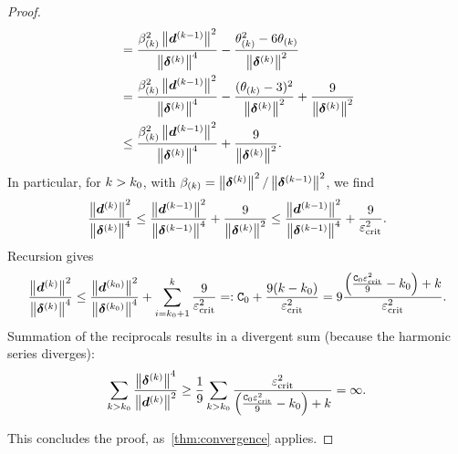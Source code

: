 \documentclass{article}
\theoremstyle{plain}
\theoremstyle{definition}
\begin{document}
\begin{proof}
\begin{align}
		&=
		\frac{
			\beta_{(k)}^2\left\|\bm{d}^{(k-1)}\right\|^2
		}{
			\left\|\bm{\delta}^{(k)}\right\|^4
		}
		-
		\frac{
			\theta_{(k)}^2 - 6 \theta_{(k)}
		}{
			\left\|\bm{\delta}^{(k)}\right\|^2
		}
		\nonumber
		\\
		&=
		\frac{
			\beta_{(k)}^2\left\|\bm{d}^{(k-1)}\right\|^2
		}{
			\left\|\bm{\delta}^{(k)}\right\|^4
		}
		-
		\frac{
			(\theta_{(k)} -3 )^2
		}{
			\left\|\bm{\delta}^{(k)}\right\|^2
		}
		+
		\frac{9}{\left\|\bm{\delta}^{(k)}\right\|^2}
		\nonumber
		\\
		&\leq
		\frac{
			\beta_{(k)}^2\left\|\bm{d}^{(k-1)}\right\|^2
		}{
			\left\|\bm{\delta}^{(k)}\right\|^4
		}
		+
		\frac{9}{\left\|\bm{\delta}^{(k)}\right\|^2}.
		\label{eqn:recalcitratedLinearly}
	\end{align}
	In particular, for $k > k_0$, with
	$\beta_{(k)} = \left\|\bm{\delta}^{(k)}\right\|^2 / \left\|\bm{\delta}^{(k-1)}\right\|^2$,
	we find
	$$
	\frac{\left\|\bm{d}^{(k)}\right\|^2}{\left\|\bm{\delta}^{(k)}\right\|^4}
	\leq
	\frac{\left\|\bm{d}^{(k-1)}\right\|^2}{\left\|\bm{\delta}^{(k-1)}\right\|^4}
	+ \frac{9}{\left\|\bm{\delta}^{(k)}\right\|^2}
	\leq
	\frac{\left\|\bm{d}^{(k-1)}\right\|^2}{\left\|\bm{\delta}^{(k-1)}\right\|^4}
	+ \frac{9}{\varepsilon_{\mathrm{crit}}^2}.
	$$
	Recursion gives
	$$
	\frac{\left\|\bm{d}^{(k)}\right\|^2}{\left\|\bm{\delta}^{(k)}\right\|^4}
	\leq
	\frac{\left\|\bm{d}^{(k_0)}\right\|^2}{\left\|\bm{\delta}^{(k_0)}\right\|^4}
	+
	\sum_{i=k_0 + 1}^k
	\frac{9}{\varepsilon_{\mathrm{crit}}^2}
	=:
	\mathtt C_0
	+
	\frac{9(k - k_0)}{\varepsilon_{\mathrm{crit}}^2}
	=
	9 \frac{
		\left(\frac{\mathtt C_0 \varepsilon_{\mathrm{crit}}^2}{9} - k_0\right) + k
	}{
		\varepsilon_{\mathrm{crit}}^2}.
	$$
	Summation of the reciprocals results in a 
	divergent sum (because the harmonic series diverges):
	$$
	\sum_{k>k_0}
	\frac{\left\|\bm{\delta}^{(k)}\right\|^4}{\left\|\bm{d}^{(k)}\right\|^2}
	\geq 
	\frac{1}{9}
	\sum_{k>k_0}
	\frac{
		\varepsilon_{\mathrm{crit}}^2
		}{
		\left(\frac{\mathtt C_0 \varepsilon_{\mathrm{crit}}^2}{9} - k_0\right) + k
	}
	= \infty.
	$$

	This concludes the proof, as~\cref{thm:convergence} applies.
\end{proof}
\end{document}
